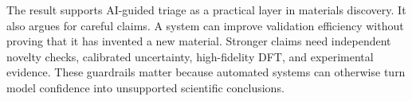 The result supports AI-guided triage as a practical layer in materials discovery. It also argues for careful claims. A system can improve validation efficiency without proving that it has invented a new material. Stronger claims need independent novelty checks, calibrated uncertainty, high-fidelity DFT, and experimental evidence. These guardrails matter because automated systems can otherwise turn model confidence into unsupported scientific conclusions.
